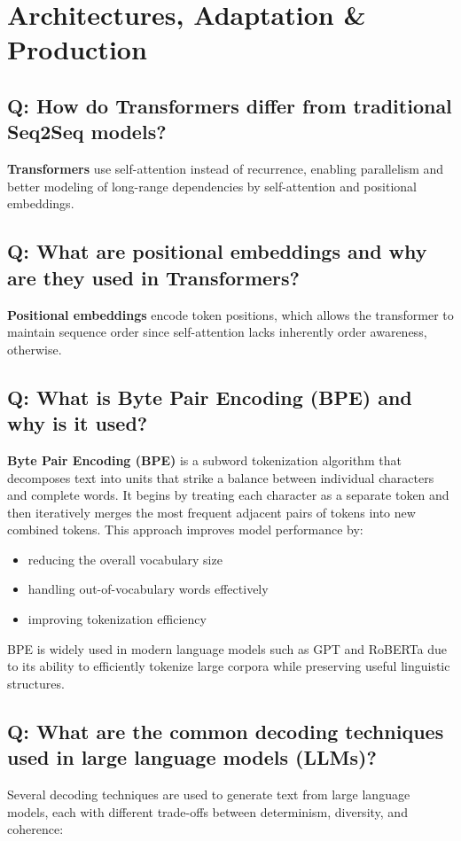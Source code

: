 \section{Architectures, Adaptation \& Production}

\subsection*{Q: How do Transformers differ from traditional Seq2Seq models?}
\textbf{Transformers} use self-attention instead of recurrence, enabling parallelism and better modeling of long-range dependencies by self-attention and positional embeddings.

\subsection*{Q: What are positional embeddings and why are they used in Transformers?}
\textbf{Positional embeddings} encode token positions, which allows the transformer to maintain sequence order since self-attention lacks inherently order awareness, otherwise.

\subsection*{Q: What is Byte Pair Encoding (BPE) and why is it used?}
\textbf{Byte Pair Encoding (BPE)} is a subword tokenization algorithm that decomposes text into units that strike a balance between individual characters and complete words. It begins by treating each character as a separate token and then iteratively merges the most frequent adjacent pairs of tokens into new combined tokens. This approach improves model performance by:
\begin{itemize}
	\item reducing the overall vocabulary size
	\item handling out-of-vocabulary words effectively
	\item improving tokenization efficiency
\end{itemize}

BPE is widely used in modern language models such as GPT and RoBERTa due to its ability to efficiently tokenize large corpora while preserving useful linguistic structures.

\subsection*{Q: What are the common decoding techniques used in large language models (LLMs)?}
Several decoding techniques are used to generate text from large language models, each with different trade-offs between determinism, diversity, and coherence:

